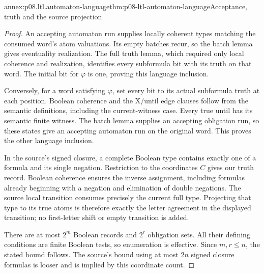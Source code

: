 \begin{annexitem}{annex:p08.ltl.automaton-language}{thm:p08-ltl-automaton-language}{Acceptance, truth and the source projection}
\begin{proof}
An accepting automaton run supplies locally coherent types
matching the consumed word's atom valuations. Its empty batches
recur, so the batch lemma gives eventuality realization. The
full truth lemma, which required only local coherence and
realization, identifies every subformula bit with its truth on
that word. The initial bit for \(\varphi\) is one, proving
this language inclusion.

Conversely, for a word satisfying \(\varphi\), set every bit
to its actual subformula truth at each position. Boolean
coherence and the X/until edge clauses follow from the semantic
definitions, including the current-witness case. Every true
until has its semantic finite witness. The batch lemma supplies
an accepting obligation run, so these states give an accepting
automaton run on the original word. This proves the other
language inclusion.

In the source's signed closure, a complete Boolean type contains
exactly one of a formula and its single negation. Restriction
to the coordinates \(C\) gives our truth record. Boolean
coherence ensures the inverse assignment, including formulas
already beginning with a negation and elimination of double
negations. The source local transition consumes precisely the
current full type. Projecting that type to its true atoms is
therefore exactly the letter agreement in the displayed
transition; no first-letter shift or empty transition is added.

There are at most \(2^m\) Boolean records and \(2^r\)
obligation sets. All their defining conditions are finite
Boolean tests, so enumeration is effective. Since \(m,r\leq n\),
the stated bound follows. The source's bound using at most
\(2n\) signed closure formulas is looser and is implied by
this coordinate count.
\end{proof}
\end{annexitem}

